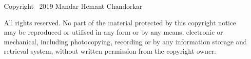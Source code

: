 \vspace{\baselineskip}

{\small \noindent
Copyright \textcopyright \ 2019 Mandar Hemant Chandorkar

\noindent
All rights reserved. No part of the material protected by this copyright notice may be reproduced 
or utilised in any form or by any means, electronic or mechanical, including photocopying, 
recording or by any information storage and retrieval system, without written permission from the 
copyright owner.
}